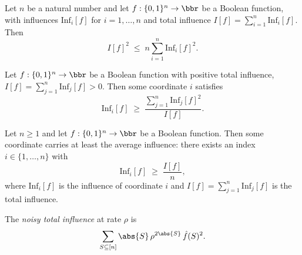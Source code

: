 \begin{lemma}
\label{KKL.cauchy_schwarz_influences}
\leanok
{}
Let $n$ be a natural number and let $f : \{0,1\}^n \to \bbr$ be a Boolean function, with
influences $\mathrm{Inf}_i[f]$ for $i = 1, \dots, n$ and total influence $I[f] =
\sum_{i=1}^n \mathrm{Inf}_i[f]$. Then
\[
  I[f]^2 \;\le\; n \sum_{i=1}^{n} \mathrm{Inf}_i[f]^2 .
\]
\end{lemma}

\begin{lemma}
\label{KKL.max_influence_from_sum_sq}
\leanok
{}
Let $f : \{0,1\}^n \to \bbr$ be a Boolean function with positive total influence, $I[f]
= \sum_{j=1}^{n} \mathrm{Inf}_j[f] > 0$. Then some coordinate $i$ satisfies
\[
  \mathrm{Inf}_i[f] \;\ge\; \frac{\sum_{j=1}^{n} \mathrm{Inf}_j[f]^2}{I[f]}.
\]
\end{lemma}

\begin{theorem}
\label{KKL.KKL_trivial}
\leanok
{}
Let $n \ge 1$ and let $f : \{0,1\}^n \to \bbr$ be a Boolean function. Then some
coordinate carries at least the average influence: there exists an index $i \in
\{1,\dots,n\}$ with
\[
  \mathrm{Inf}_i[f] \;\ge\; \frac{I[f]}{n},
\]
where $\mathrm{Inf}_i[f]$ is the influence of coordinate $i$ and $I[f] = \sum_{j=1}^n
\mathrm{Inf}_j[f]$ is the total influence.
\end{theorem}

\begin{definition}
\label{KKL.noisyTotalInfluence}
\leanok
{}
The \emph{noisy total influence} at rate $\rho$ is
\[
  \sum_{S \subseteq [n]} \abs{S}\,\rho^{2\abs{S}}\,\hat f(S)^2 .
\]
\end{definition}

